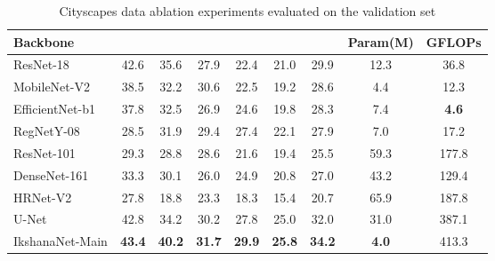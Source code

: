 \documentclass{article}
\begin{document}
\begin{table}[ht]
\caption{Cityscapes data ablation experiments evaluated on the validation set}
\begin{center}
\begin{adjustbox}{width=1\textwidth}
  \begin{tabular}{lSSSSSSSS}
    \toprule
     {Backbone} &
     {} & {} & {} & {} & {} & {\textbf{}} & {Param(M)} &{GFLOPs}  \\
      \midrule
    ResNet-18  \cite{he2016deep} & 42.6 & 35.6 & 27.9 & 22.4 & 21.0 & 29.9 & 12.3 & 36.8 \\
MobileNet-V2 \cite{mobileNetV2} & 38.5 & 32.2 & 30.6 & 22.5 & 19.2 & 28.6 &  4.4& 12.3 \\
    EfficientNet-b1 \cite{TanL19} & 37.8 & 32.5 & 26.9 & 24.6 & 19.8 & 28.3 & 7.4 & \bfseries 4.6 \\
    RegNetY-08 \cite{RegNet} &  28.5& 31.9 & 29.4 & 27.4 & 22.1 & 27.9  & 7.0 & 17.2 \\
    ResNet-101 \cite{he2016deep} & 29.3 & 28.8 & 28.6 & 21.6 & 19.4 & 25.5 & 59.3 & 177.8 \\
    DenseNet-161 \cite{huang2017densely} & 33.3 & 30.1 & 26.0 & 24.9 & 20.8 & 27.0 & 43.2 & 129.4 \\
    HRNet-V2 \cite{SunZJCXLMWLW19} & 27.8 & 18.8 & 23.3 & 18.3 & 15.4 & 20.7 & 65.9 & 187.8 \\
    U-Net\cite{ronneberger2015u} & 42.8 & 34.2 & 30.2 & 27.8 & 25.0 & 32.0 & 31.0 & 387.1 \\
    IkshanaNet-Main &  \bfseries 43.4 & \bfseries 40.2 & \bfseries 31.7 & \bfseries 29.9 & \bfseries 25.8 &  \bfseries 34.2  & \bfseries 4.0  & 413.3 \\

    \bottomrule 
  \end{tabular}
\end{adjustbox}
\end{center}

 \label{Table2}
\end{table}
\end{document}
